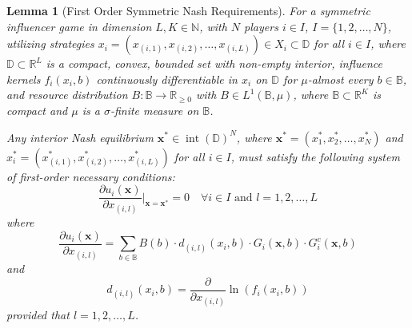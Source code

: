 \documentclass{article}
\newtheorem{lemma}[theorem]{Lemma}
\begin{document}
            \begin{lemma}[First Order Symmetric Nash Requirements]\label{lem:SI_requirements}
                For a symmetric influencer game in dimension $L,K\in \mathbb{N}$, with $N$ players 
                $i\in I$, $I=\{1,2,\dots,N\}$, utilizing strategies 
                $x_i=(x_{(i,1)},x_{(i,2)},\dots,x_{(i,L)}) \in X_i \subset \mathbb{D}$ for all $i\in I$, 
                where $\mathbb{D} \subset \mathbb{R}^L$ is a compact, convex, bounded set with non-empty 
                interior, influence kernels $f_i(x_i,b)$ continuously differentiable in $x_i$ on 
                $\mathbb{D}$ for $\mu$-almost every $b\in\mathbb{B}$, and resource distribution 
                $B:\mathbb{B}\to \mathbb{R}_{\geq 0}$ with $B \in L^1(\mathbb{B},\mu)$, where 
                $\mathbb{B}\subset \mathbb{R}^K$ is compact and $\mu$ is a $\sigma$-finite measure on 
                $\mathbb{B}$.
                
                Any interior Nash equilibrium $\mathbf{x}^*\in \operatorname{int}(\mathbb{D})^N$, where 
                $\mathbf{x}^*=(x_1^*,x_2^*,\dots, x_N^*)$ and 
                $x^*_i=(x_{(i,1)}^*,x_{(i,2)}^*,\dots, x_{(i,L)}^*)$ for all $i\in I$, must satisfy 
                the following system of first-order necessary conditions:
                \begin{equation}
                    \frac{\partial u_i(\mathbf{x})}{\partial x_{(i,l)}}\bigg|_{\mathbf{x}=\mathbf{x}^*}
                    =0 \quad \forall i\in I \text{ and } l=1,2,\dots,L
                \end{equation}
                where
                \begin{equation}
                    \frac{\partial u_i(\mathbf{x})}{\partial x_{(i,l)}}= 
                    \sum_{b \in \mathbb{B}} B(b) \cdot d_{(i,l)}(x_{i},b) \cdot 
                    G_i(\mathbf{x},b) \cdot G_i^c(\mathbf{x},b) 
                \end{equation}
                and 
                \begin{equation}
                    d_{(i,l)}(x_{i},b)=\frac{\partial}{\partial x_{(i,l)}}\ln(f_i(x_{i},b))
                \end{equation}
                provided that
                $l=1,2,\dots,L$.
            \end{lemma}
\end{document}
